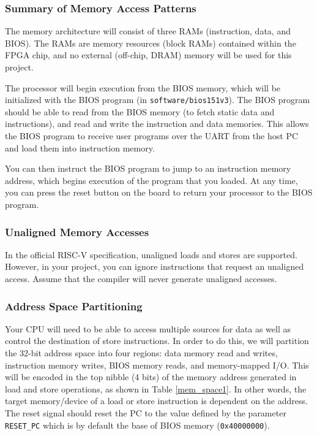 \documentclass[11pt]{article}
\begin{document}
\subsubsection{Summary of Memory Access Patterns}
The memory architecture will consist of three RAMs (instruction, data, and BIOS).
The RAMs are memory resources (block RAMs) contained within the FPGA chip, and no external (off-chip, DRAM) memory will be used for this project.

The processor will begin execution from the BIOS memory, which will be initialized with the BIOS program (in \verb|software/bios151v3|).
The BIOS program should be able to read from the BIOS memory (to fetch static data and instructions), and read and write the instruction and data memories.
This allows the BIOS program to receive user programs over the UART from the host PC and load them into instruction memory.

You can then instruct the BIOS program to jump to an instruction memory address, which begins execution of the program that you loaded.
At any time, you can press the reset button on the board to return your processor to the BIOS program.

\subsubsection{Unaligned Memory Accesses}
In the official RISC-V specification, unaligned loads and stores are supported.
However, in your project, you can ignore instructions that request an unaligned access.
Assume that the compiler will never generate unaligned accesses.

\subsubsection{Address Space Partitioning}
Your CPU will need to be able to access multiple sources for data as well as control the destination of store instructions.
In order to do this, we will partition the 32-bit address space into four regions: data memory read and writes, instruction memory writes, BIOS memory reads, and memory-mapped I/O.
This will be encoded in the top nibble (4 bits) of the memory address generated in load and store operations, as shown in Table \ref{mem_space1}.
In other words, the target memory/device of a load or store instruction is dependent on the address.
The reset signal should reset the PC to the value defined by the parameter \verb|RESET_PC| which is by default the base of BIOS memory (\verb|0x40000000|).
\end{document}
